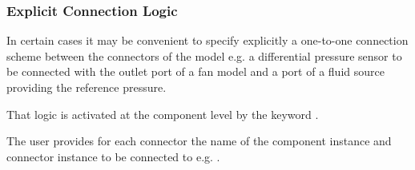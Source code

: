 \documentclass[letterpaper,10pt, openany,english]{sphinxmanual}
\begin{document}
\subsubsection{Explicit Connection Logic}
\label{\detokenize{requirements:explicit-connection-logic}}\label{\detokenize{requirements:sec-explicit}}
In certain cases it may be convenient to specify explicitly a one-to-one connection scheme between the connectors of the model e.g. a differential pressure sensor to be connected with the outlet port of a fan model and a port of a fluid source providing the reference pressure.

That logic is activated at the component level by the keyword .

The user provides for each connector the name of the component instance and connector instance to be connected to e.g. .
\end{document}
